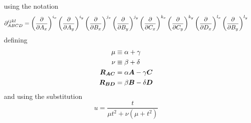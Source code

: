     using the notation
        \begin{equation}
                 \prtl^{ijkl}_{ABCD} = \prdp{A_x}{i_x}\prdp{A_y}{i_y}
                 \prdp{B_x}{j_x}\prdp{B_y}{j_y} \prdp{C_x}{k_x}\prdp{C_y}{k_y}
                 \prdp{D_x}{l_x}\prdp{B_y}{l_y}
        \end{equation}
    defining
        \begin{equation}
            \begin{aligned}
                \mu &\equiv \alpha + \gamma \\
                \nu &\equiv \beta + \delta \\
                \blds{R_{AC}} &= \alpha\blds{A} - \gamma\blds{C} \\
                \blds{R_{BD}} &= \beta\blds{B} - \delta\blds{D} \\
            \end{aligned}
        \end{equation}
    and using the substitution
        \begin{equation}
            u = \frac{t}{\mu t^2 + \nu(\mu + t^2)}
        \end{equation}

